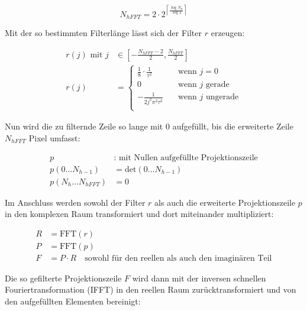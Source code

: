 \begin{equation}
    N_{hFFT} = 2 \cdot 2^{\left\lceil \frac{\log N_h}{\log 2} \right\rceil}
\end{equation}

Mit der so bestimmten Filterlänge lässt sich der Filter $r$ erzeugen:

\begin{equation}
    \begin{aligned}
        r(j) \text{ mit } j &\in \left[-\frac{N_{hFFT} - 2}{2}, \frac{N_{hFFT}}{2}\right]\\
        r(j) &=
            \begin{cases}
                \frac{1}{8} \cdot \frac{1}{\tau^2} & \quad \text{wenn } j = 0\\
                0 & \quad \text{wenn } j \text{ gerade}\\
                -\frac{1}{2j^2\pi^2\tau^2} & \quad \text{wenn } j \text{ ungerade}\\
            \end{cases}
    \end{aligned}
\end{equation}

Nun wird die zu filternde Zeile so lange mit $0$ aufgefüllt, bis die erweiterte Zeile $N_{hFFT}$ Pixel umfasst:

\begin{equation}
    \begin{aligned}
        p &: \text{ mit Nullen aufgefüllte Projektionszeile}\\
        p(0 \dots N_{h - 1}) &= \text{det}(0 \dots N_{h - 1})\\
        p(N_{h} \dots N_{hFFT}) &= 0
    \end{aligned}
\end{equation}

Im Anschluss werden sowohl der Filter $r$ als auch die erweiterte Projektionszeile $p$ in den komplexen Raum
transformiert und dort miteinander multipliziert:

\begin{equation}
    \begin{aligned}
        R &= \text{FFT}(r)\\
        P &= \text{FFT}(p)\\
        F &= P \cdot R \quad \text{sowohl für den reellen als auch den imaginären Teil}
    \end{aligned}
\end{equation}

Die so gefilterte Projektionszeile $F$ wird dann mit der inversen schnellen Fouriertransformation (IFFT) in den
reellen Raum zurücktransformiert und von den {\glqq}aufgefüllten{\grqq} Elementen bereinigt:

